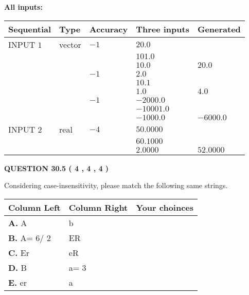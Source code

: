 \documentclass[12pt]{article}
\begin{document}
   
   
   
\noindent\vspace{0.1in}\hspace{-0.08in} {\textbf{\Large{All inputs: }}}
   
   
  
  
\noindent\begin{tabular}{|l|l|l|l|l|}
\hline
 Sequential & Type & Accuracy & Three inputs & Generated \\ 
\hline
 
 
  INPUT $            1 $ & vector & $           -1  $ & $
20.0
  $ & \\
  & & & $
101.0
  $ & \\
  & & & $
10.0
$ & $ 20.0 $ 
  \\
  & & $           -1  $ & $
2.0
  $ & \\
  & & & $
10.1
  $ & \\
  & & & $
1.0
$ & $ 4.0 $ 
  \\
  & & $           -1  $ & $
-2000.0
  $ & \\
  & & & $
-10001.0
  $ & \\
  & & & $
-1000.0
$ & $ -6000.0 $ 
 \\  \hline  
 
 
  INPUT $            2 $ & real & $           -4  $ & $
 50.0000
  $ & \\
  & & &  $
 60.1000
  $ & \\
  & & &  $
 2.0000
 $ & $ 52.0000 $ 
 \\  \hline  
 \end{tabular}
   
   
  
\vspace{0.2in}
  
{\textbf{\Large{QUESTION
30.5 
 (           4 ,           4 ,           4 )
}}}
  
  
Considering case-insensitivity, please match the following same strings.
  
  
\begin{tabular}{|l|l|l|}
 \hline
 Column Left & Column Right  & Your choinces \\ 
 \hline
{\textbf{\large{
A.}}}
A
  & 
b
 & 
 \\ 
 \hline
{\textbf{\large{
B.}}}
 A= %
6/ %
2

  & 
ER
 & 
 \\ 
 \hline
{\textbf{\large{
C.}}}
Er
  & 
eR
 & 
 \\ 
 \hline
{\textbf{\large{
D.}}}
B
  & 
 a= %
3
 & 
 \\ 
 \hline
{\textbf{\large{
E.}}}
er
  & 
a
 & 
 \\ 
 \hline
 \end{tabular}
  
\end{document}
